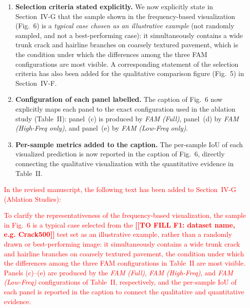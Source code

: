 \documentclass[lettersize,journal,onecolumn,12pt]{IEEEtran}
\newcommand{\FILLIN}[1]{\colorbox{fillyellow}{\textcolor{fillorange}{\textbf{[[TO FILL #1]]}}}}
\begin{document}
\begin{enumerate}
    \item \textbf{Selection criteria stated explicitly.}
    We now explicitly state in Section~IV-G that the sample shown in the frequency-based visualization (Fig.~6) is a
    \emph{typical case chosen as an illustrative example} (not randomly sampled, and not a best-performing case):
    it simultaneously contains a wide trunk crack and hairline branches on coarsely textured pavement, which is the
    condition under which the differences among the three FAM configurations are most visible.
    A corresponding statement of the selection criteria has also been added for the qualitative comparison figure
    (Fig.~5) in Section~IV-F.

    \item \textbf{Configuration of each panel labelled.}
    The caption of Fig.~6 now explicitly maps each panel to the exact configuration used in the ablation study
    (Table~II): panel~(c) is produced by \emph{FAM (Full)}, panel~(d) by \emph{FAM (High-Freq only)}, and panel~(e)
    by \emph{FAM (Low-Freq only)}.

    \item \textbf{Per-sample metrics added to the caption.}
    The per-sample IoU of each visualized prediction is now reported in the caption of Fig.~6, directly connecting
    the qualitative visualization with the quantitative evidence in Table~II.
\end{enumerate}

\textcolor{red}{In the revised manuscript, the following text has been added to Section~IV-G (Ablation Studies):}

\textcolor{red}{
To clarify the representativeness of the frequency-based visualization, the sample in Fig.~6
is a typical case selected from the \FILLIN{F1: dataset name, e.g. Crack500} test set as an illustrative example,
rather than a randomly drawn or best-performing image: it simultaneously contains a wide trunk crack and hairline
branches on coarsely textured pavement, the condition under which the differences among the three FAM configurations
in Table~II are most visible. Panels (c)--(e) are produced by the \emph{FAM (Full)}, \emph{FAM (High-Freq)}, and
\emph{FAM (Low-Freq)} configurations of Table~II, respectively, and the per-sample IoU of each panel is reported in
the caption to connect the qualitative and quantitative evidence.
}
\end{document}
